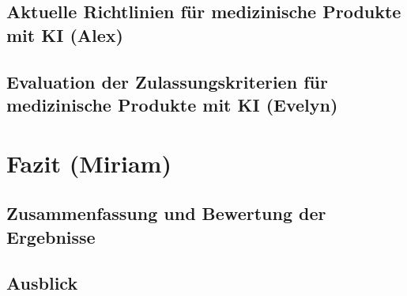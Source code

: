 \documentclass[a4paper, 11pt]{article}
\begin{document}
		\subsection{Aktuelle Richtlinien für medizinische Produkte mit KI \small{(Alex)}}\label{sec:guidlines}
			
		\subsection{Evaluation der Zulassungskriterien für medizinische Produkte mit KI \small{(Evelyn)}}\label{sec:sufficient-criteria}
			
		
	
	\newpage
	\section{Fazit \small{(Miriam)}}\label{sec:conclusion}
		
		\subsection{Zusammenfassung und Bewertung der Ergebnisse}\label{sec:summary}
			
		\subsection{Ausblick}\label{sec:perspective}
			
	  
   
    \newpage
    \nocite{*}
    \printbibliography[heading=bibintoc,type=article, title={Literatur}]
	
   
\end{document}
